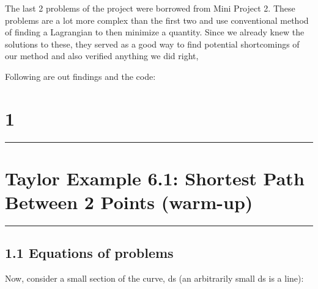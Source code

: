 \documentclass[hidelinks, 11pt]{article}
\begin{document}
The last 2 problems of the project were borrowed from Mini Project 2. These problems are a lot more complex than the first two and use conventional method of finding a Lagrangian to then minimize a quantity. Since we already knew the solutions to these, they served as a good way to find potential shortcomings of our method and also verified anything we did right, 

Following are out findings and the code:

\newpage

\begin{center}
  \section*{1}
  \noindent\rule{16cm}{0.4pt}
  \section*{Taylor Example 6.1: Shortest Path Between 2 Points (warm-up)} %
  \noindent\rule{16cm}{0.4pt}
\end{center}

\subsection*{1.1 Equations of problems}

\begin{center}
\end{center}


\noindent Now, consider a small section of the curve, ds (an arbitrarily small ds is a line): 

\begin{center}
\end{center}
\end{document}
